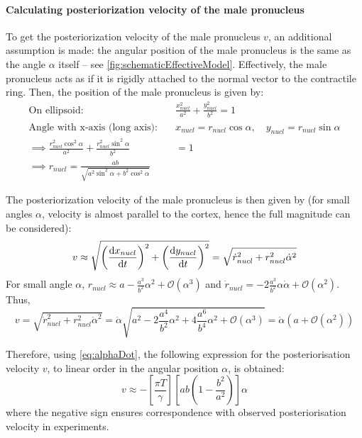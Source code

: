 \paragraph{Calculating posteriorization velocity of the male pronucleus}
To get the posteriorization velocity of the male pronucleus $v$, an additional assumption is made: the angular position of the male pronucleus is the same as the angle $\alpha$ itself -- see \autoref{fig:schematicEffectiveModel}. Effectively, the male pronucleus acts as if it is rigidly attached to the normal vector to the contractile ring. Then, the position of the male pronucleus is given by:
\begin{align*}
    \textrm{On ellipsoid:}\quad & \frac{x_{nucl}^2}{a^2} + \frac{y_{nucl}^2}{b^2} = 1\\
    \textrm{Angle with x-axis (long axis):}\quad & x_{nucl} = r_{nucl}\cos\alpha, \quad y_{nucl} = r_{nucl}\sin\alpha\\
    \implies \frac{r_{nucl}^2\cos^2\alpha}{a^2} + \frac{r_{nucl}^2\sin^2\alpha}{b^2} &= 1\\
    \implies r_{nucl} = \frac{ab}{\sqrt{a^2\sin^2\alpha + b^2\cos^2\alpha}}
\end{align*}

The posteriorization velocity of the male pronucleus is then given by (for small angles $\alpha$, velocity is almost parallel to the cortex, hence the full magnitude can be considered):
\begin{align*}
    v \approx \sqrt{\left(\dv{x_{nucl}}{t}\right)^2 + \left(\dv{y_{nucl}}{t}\right)^2} = \sqrt{\dot{r}_{nucl}^2 + r_{nucl}^2\dot{\alpha}^2} 
\end{align*}
For small angle $\alpha$, $r_{nucl} \approx a - \frac{a^3}{b^2}\alpha^2 + \mathcal{O}(\alpha^3)$ and $\dot{r}_{nucl} = -2\frac{a^3}{b^2}\alpha\dot{\alpha} + \mathcal{O}(\alpha^2)$. Thus,
\begin{equation*}
    v = \sqrt{\dot{r}_{nucl}^2 + r_{nucl}^2\dot{\alpha}^2} = \dot{\alpha}\sqrt{a^2 - 2\frac{a^4}{b^2}\alpha^2 + 4\frac{a^6}{b^4}\alpha^2 + \mathcal{O}(\alpha^3)} = \dot{\alpha}\left(a + \mathcal{O}(\alpha^2)\right)
\end{equation*}

Therefore, using \eqref{eq:alphaDot}, the following expression for the posteriorisation velocity $v$, to linear order in the angular position $\alpha$, is obtained:
\begin{equation}\label{eq:velocity}
    v \approx - \left[\frac{\pi T}{\gamma}\right] \left[ab\left(1 - \frac{b^2}{a^2}\right)\right]\alpha
\end{equation}
where the negative sign ensures correspondence with observed posteriorisation velocity in experiments.

